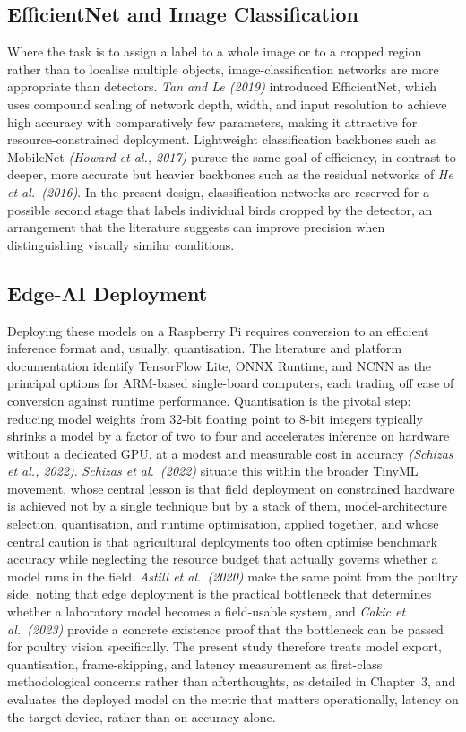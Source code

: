 \documentclass[12pt,a4paper]{report}
\begin{document}
\subsection{EfficientNet and Image Classification}

Where the task is to assign a label to a whole image or to a cropped region rather than to localise multiple objects, image-classification networks are more appropriate than detectors. \textit{Tan and Le (2019)} introduced EfficientNet, which uses compound scaling of network depth, width, and input resolution to achieve high accuracy with comparatively few parameters, making it attractive for resource-constrained deployment. Lightweight classification backbones such as MobileNet \textit{(Howard et al., 2017)} pursue the same goal of efficiency, in contrast to deeper, more accurate but heavier backbones such as the residual networks of \textit{He et al.\ (2016)}. In the present design, classification networks are reserved for a possible second stage that labels individual birds cropped by the detector, an arrangement that the literature suggests can improve precision when distinguishing visually similar conditions.

\subsection{Edge-AI Deployment}

Deploying these models on a Raspberry Pi requires conversion to an efficient inference format and, usually, quantisation. The literature and platform documentation identify TensorFlow Lite, ONNX Runtime, and NCNN as the principal options for ARM-based single-board computers, each trading off ease of conversion against runtime performance. Quantisation is the pivotal step: reducing model weights from 32-bit floating point to 8-bit integers typically shrinks a model by a factor of two to four and accelerates inference on hardware without a dedicated GPU, at a modest and measurable cost in accuracy \textit{(Schizas et al., 2022)}. \textit{Schizas et al.\ (2022)} situate this within the broader TinyML movement, whose central lesson is that field deployment on constrained hardware is achieved not by a single technique but by a stack of them, model-architecture selection, quantisation, and runtime optimisation, applied together, and whose central caution is that agricultural deployments too often optimise benchmark accuracy while neglecting the resource budget that actually governs whether a model runs in the field. \textit{Astill et al.\ (2020)} make the same point from the poultry side, noting that edge deployment is the practical bottleneck that determines whether a laboratory model becomes a field-usable system, and \textit{Cakic et al.\ (2023)} provide a concrete existence proof that the bottleneck can be passed for poultry vision specifically. The present study therefore treats model export, quantisation, frame-skipping, and latency measurement as first-class methodological concerns rather than afterthoughts, as detailed in Chapter~3, and evaluates the deployed model on the metric that matters operationally, latency on the target device, rather than on accuracy alone.
\end{document}
